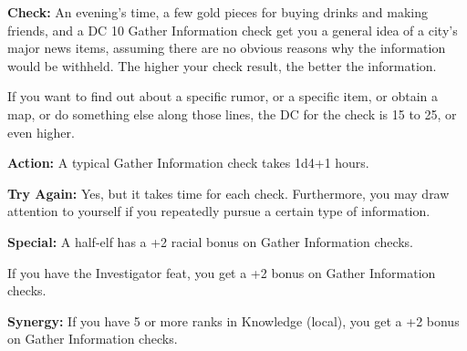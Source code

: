 \textbf{Check:} An evening’s time, a few gold pieces for buying drinks and making friends, and a DC 10 Gather Information check get you a general idea of a city’s major news items, assuming there are no obvious reasons why the information would be withheld. The higher your check result, the better the information.

If you want to find out about a specific rumor, or a specific item, or obtain a map, or do something else along those lines, the DC for the check is 15 to 25, or even higher.

\textbf{Action:} A typical Gather Information check takes 1d4+1 hours.

\textbf{Try Again:} Yes, but it takes time for each check. Furthermore, you may draw attention to yourself if you repeatedly pursue a certain type of information.

\textbf{Special:} A half-elf has a +2 racial bonus on Gather Information checks.

If you have the Investigator feat, you get a +2 bonus on Gather Information checks.

\textbf{Synergy:} If you have 5 or more ranks in Knowledge (local), you get a +2 bonus on Gather Information checks.